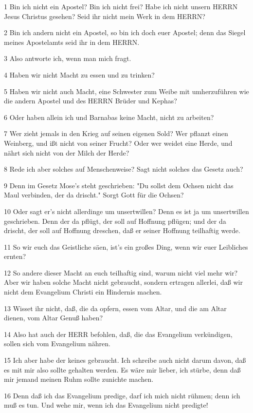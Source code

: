 \par 1 Bin ich nicht ein Apostel? Bin ich nicht frei? Habe ich nicht unsern HERRN Jesus Christus gesehen? Seid ihr nicht mein Werk in dem HERRN?
\par 2 Bin ich andern nicht ein Apostel, so bin ich doch euer Apostel; denn das Siegel meines Apostelamts seid ihr in dem HERRN.
\par 3 Also antworte ich, wenn man mich fragt.
\par 4 Haben wir nicht Macht zu essen und zu trinken?
\par 5 Haben wir nicht auch Macht, eine Schwester zum Weibe mit umherzuführen wie die andern Apostel und des HERRN Brüder und Kephas?
\par 6 Oder haben allein ich und Barnabas keine Macht, nicht zu arbeiten?
\par 7 Wer zieht jemals in den Krieg auf seinen eigenen Sold? Wer pflanzt einen Weinberg, und ißt nicht von seiner Frucht? Oder wer weidet eine Herde, und nährt sich nicht von der Milch der Herde?
\par 8 Rede ich aber solches auf Menschenweise? Sagt nicht solches das Gesetz auch?
\par 9 Denn im Gesetz Mose's steht geschrieben: "Du sollst dem Ochsen nicht das Maul verbinden, der da drischt." Sorgt Gott für die Ochsen?
\par 10 Oder sagt er's nicht allerdinge um unsertwillen? Denn es ist ja um unsertwillen geschrieben. Denn der da pflügt, der soll auf Hoffnung pflügen; und der da drischt, der soll auf Hoffnung dreschen, daß er seiner Hoffnung teilhaftig werde.
\par 11 So wir euch das Geistliche säen, ist's ein großes Ding, wenn wir euer Leibliches ernten?
\par 12 So andere dieser Macht an euch teilhaftig sind, warum nicht viel mehr wir? Aber wir haben solche Macht nicht gebraucht, sondern ertragen allerlei, daß wir nicht dem Evangelium Christi ein Hindernis machen.
\par 13 Wisset ihr nicht, daß, die da opfern, essen vom Altar, und die am Altar dienen, vom Altar Genuß haben?
\par 14 Also hat auch der HERR befohlen, daß, die das Evangelium verkündigen, sollen sich vom Evangelium nähren.
\par 15 Ich aber habe der keines gebraucht. Ich schreibe auch nicht darum davon, daß es mit mir also sollte gehalten werden. Es wäre mir lieber, ich stürbe, denn daß mir jemand meinen Ruhm sollte zunichte machen.
\par 16 Denn daß ich das Evangelium predige, darf ich mich nicht rühmen; denn ich muß es tun. Und wehe mir, wenn ich das Evangelium nicht predigte!
